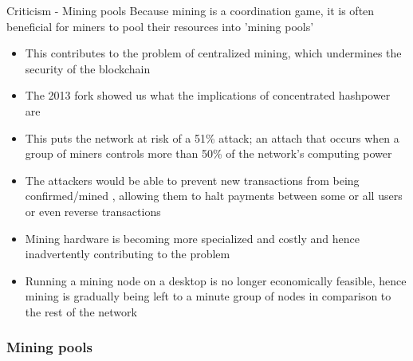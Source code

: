 \documentclass[10pt]{beamer}
\begin{document}


\begin{frame}{Criticism - Mining pools}
	Because mining is a coordination game, it is often beneficial for miners to pool their resources into 'mining pools'
	\begin{itemize}
		\item This contributes to the problem of centralized mining, which undermines the security of the blockchain
		\item The 2013 fork showed us what the implications of concentrated hashpower are
		\item This puts the network at risk of a 51\% attack; an attach that occurs when a group of miners controls more than 50\% of the network's computing power
		\item The attackers would be able to prevent new transactions from being confirmed/mined , allowing them to halt payments between some or all users or even reverse transactions
		\item Mining hardware is becoming more specialized and costly and hence inadvertently contributing to the problem
		\item Running a mining node on a desktop is no longer economically feasible, hence mining is gradually being left to a minute group of nodes in comparison to the rest of the network
	\end{itemize}
\end{frame}

\subsubsection{Mining pools}
\end{document}
